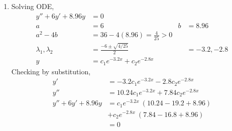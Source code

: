 \begin{enumerate}
    \item Solving ODE,
          \begin{align}
              y'' + 6y' + 8.96y        & = 0                                 \\
              a                        & = 6                               &
              b                        & = 8.96                              \\
              a^{2} - 4b               & = 36 - 4(8.96) = \frac{4}{25} > 0   \\
              \lambda_{1}, \lambda_{2} & = \frac{-6 \pm \sqrt{4/25}}{2}    &
                                       & = -3.2, -2.8                        \\
              y                        & = c_{1}e^{-3.2x} + c_{2}e^{-2.8x}
          \end{align}
          Checking by substitution,
          \begin{align}
              y'                & = -3.2c_{1}e^{-3.2x} - 2.8c_{2}e^{-2.8x}   \\
              y''               & = 10.24c_{1}e^{-3.2x} + 7.84c_{2}e^{-2.8x} \\
              y'' + 6y' + 8.96y & = c_{1}e^{-3.2x}\ (10.24 - 19.2 + 8.96)    \\
                                & + c_{2}e^{-2.8x}\ (7.84 - 16.8 + 8.96)     \\
                                & = 0
          \end{align}


\end{enumerate}

